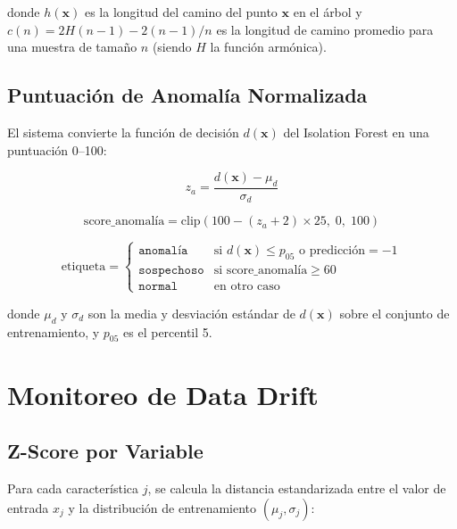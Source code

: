 \documentclass[12pt, a4paper]{article}
\begin{document}
donde $h(\mathbf{x})$ es la longitud del camino del punto $\mathbf{x}$ en el árbol y $c(n) = 2H(n-1) - 2(n-1)/n$ es la longitud de camino promedio para una muestra de tamaño $n$ (siendo $H$ la función armónica).

\subsection{Puntuación de Anomalía Normalizada}

El sistema convierte la función de decisión $d(\mathbf{x})$ del Isolation Forest en una puntuación 0--100:

\begin{equation}
  z_a = \frac{d(\mathbf{x}) - \mu_d}{\sigma_d}
  \label{eq:z_anomaly}
\end{equation}

\begin{equation}
  \text{score\_anomalía} = \text{clip}\!\left(100 - (z_a + 2) \times 25,\; 0,\; 100\right)
  \label{eq:anomaly_score}
\end{equation}

\begin{equation}
  \text{etiqueta} =
  \begin{cases}
    \texttt{anomalía}    & \text{si } d(\mathbf{x}) \leq p_{05} \text{ o predicción} = -1 \\
    \texttt{sospechoso}  & \text{si score\_anomalía} \geq 60 \\
    \texttt{normal}      & \text{en otro caso}
  \end{cases}
  \label{eq:anomaly_label}
\end{equation}

donde $\mu_d$ y $\sigma_d$ son la media y desviación estándar de $d(\mathbf{x})$ sobre el conjunto de entrenamiento, y $p_{05}$ es el percentil 5.

\section{Monitoreo de Data Drift}

\subsection{Z-Score por Variable}

Para cada característica $j$, se calcula la distancia estandarizada entre el valor de entrada $x_j$ y la distribución de entrenamiento $(\mu_j, \sigma_j)$:
\end{document}
